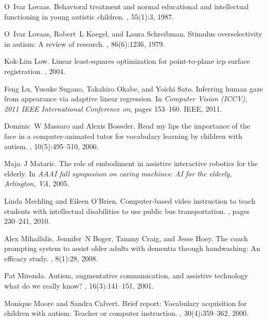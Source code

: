 \documentclass{ut-thesis}
\begin{document}
\begin{thebibliography}{100}
O~Ivar Lovaas.
\newblock Behavioral treatment and normal educational and intellectual
  functioning in young autistic children.
, 55(1):3, 1987.

O~Ivar Lovaas, Robert~L Koegel, and Laura Schreibman.
\newblock Stimulus overselectivity in autism: A review of research.
, 86(6):1236, 1979.

Kok-Lim Low.
\newblock Linear least-squares optimization for point-to-plane icp surface
  registration.
, 2004.

Feng Lu, Yusuke Sugano, Takahiro Okabe, and Yoichi Sato.
\newblock Inferring human gaze from appearance via adaptive linear regression.
\newblock In {\em Computer Vision (ICCV), 2011 IEEE International Conference
  on}, pages 153--160. IEEE, 2011.

Dominic~W Massaro and Alexis Bosseler.
\newblock Read my lips the importance of the face in a computer-animated tutor
  for vocabulary learning by children with autism.
, 10(5):495--510, 2006.

Maja~J Mataric.
\newblock The role of embodiment in assistive interactive robotics for the
  elderly.
\newblock In {\em AAAI fall symposium on caring machines: AI for the elderly,
  Arlington, VA}, 2005.

Linda Mechling and Eileen O'Brien.
\newblock Computer-based video instruction to teach students with intellectual
  disabilities to use public bus transportation.
, pages 230--241, 2010.

Alex Mihailidis, Jennifer~N Boger, Tammy Craig, and Jesse Hoey.
\newblock The coach prompting system to assist older adults with dementia
  through handwashing: An efficacy study.
, 8(1):28, 2008.

Pat Mirenda.
\newblock Autism, augmentative communication, and assistive technology what do
  we really know?
,
  16(3):141--151, 2001.

Monique Moore and Sandra Calvert.
\newblock Brief report: Vocabulary acquisition for children with autism:
  Teacher or computer instruction.
, 30(4):359--362,
  2000.


\end{thebibliography}
\end{document}
